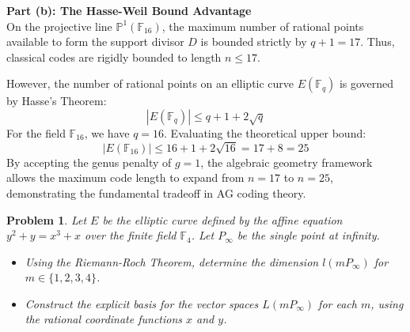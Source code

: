 \documentclass[11pt]{article}
\newtheorem{problem}{Problem}
\begin{document}
\begin{mdframed}[backgroundcolor=gray!5, linecolor=gray!50, linewidth=1pt]
\begin{center}
		\end{center}
		\vspace{0.5cm}
		
		\textbf{Part (b): The Hasse-Weil Bound Advantage} \\
		On the projective line $\mathbb{P}^1(\mathbb{F}_{16})$, the maximum number of rational points available to form the support divisor $D$ is bounded strictly by $q + 1 = 17$. Thus, classical codes are rigidly bounded to length $n \leq 17$.
		
		However, the number of rational points on an elliptic curve $E(\mathbb{F}_q)$ is governed by Hasse's Theorem:
		$$|E(\mathbb{F}_q)| \leq q + 1 + 2\sqrt{q}$$
		For the field $\mathbb{F}_{16}$, we have $q=16$. Evaluating the theoretical upper bound:
		$$|E(\mathbb{F}_{16})| \leq 16 + 1 + 2\sqrt{16} = 17 + 8 = 25$$
		By accepting the genus penalty of $g=1$, the algebraic geometry framework allows the maximum code length to expand from $n=17$ to $n=25$, demonstrating the fundamental tradeoff in AG coding theory.
	\end{mdframed}

	\newpage
	\begin{problem}
		Let $E$ be the elliptic curve defined by the affine equation $y^2 + y = x^3 + x$ over the finite field $\mathbb{F}_4$. Let $P_\infty$ be the single point at infinity. 
		\begin{itemize}
			\item[(a)] Using the Riemann-Roch Theorem, determine the dimension $l(mP_\infty)$ for $m \in \{1, 2, 3, 4\}$.
			\item[(b)] Construct the explicit basis for the vector spaces $L(mP_\infty)$ for each $m$, using the rational coordinate functions $x$ and $y$.
		\end{itemize}
	\end{problem}
	
	\vspace{0.5cm}
	
\end{document}
